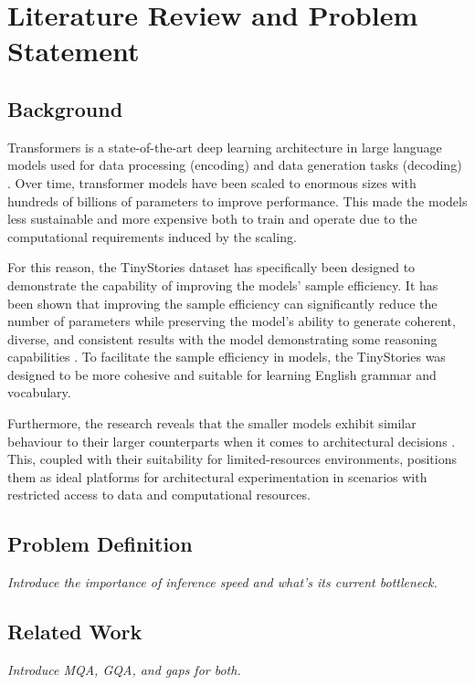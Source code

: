 \section{Literature Review and Problem Statement}
\subsection{Background}
Transformers is a state-of-the-art deep learning architecture in large language models used for data processing (encoding) and data generation tasks (decoding) \cite{vaswani_attention_2017}. Over time, transformer models have been scaled to enormous sizes with hundreds of billions of parameters to improve performance. This made the models less sustainable and more expensive both to train and operate due to the computational requirements induced by the scaling. 

For this reason, the TinyStories dataset has specifically been designed to demonstrate the capability of improving the models' sample efficiency. It has been shown that improving the sample efficiency can significantly reduce the number of parameters while preserving the model's ability to generate coherent, diverse, and consistent results with the model demonstrating some reasoning capabilities \cite{eldan_tinystories_2023}. To facilitate the sample efficiency in models, the TinyStories was designed to be more cohesive and suitable for learning English grammar and vocabulary.

Furthermore, the research reveals that the smaller models exhibit similar behaviour to their larger counterparts when it comes to architectural decisions \cite{eldan_tinystories_2023}. This, coupled with their suitability for limited-resources environments, positions them as ideal platforms for architectural experimentation in scenarios with restricted access to data and computational resources. 

\subsection{Problem Definition}
\textit{Introduce the importance of inference speed and what's its current bottleneck.}

\subsection{Related Work}
\textit{Introduce MQA, GQA, and gaps for both.}


